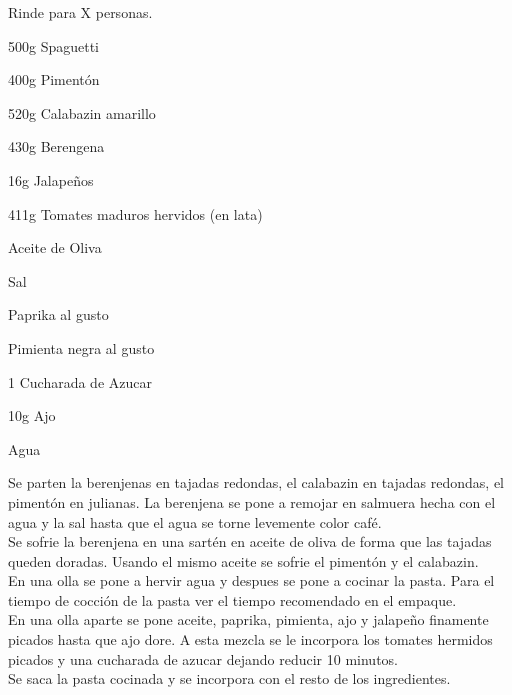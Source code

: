 
Rinde para X personas.\\

\begin{ingredientes}
\item 500g Spaguetti
\item 400g Pimentón
\item 520g Calabazin amarillo
\item 430g Berengena
\item 16g Jalapeños
\item 411g Tomates maduros hervidos (en lata)
\item Aceite de Oliva
\item Sal
\item Paprika al gusto
\item Pimienta negra al gusto
\item 1 Cucharada de Azucar
\item 10g Ajo
\item Agua
\end{ingredientes}
\preparacion
Se parten la berenjenas en tajadas redondas, el calabazin en tajadas redondas, el pimentón en julianas. La berenjena se pone a remojar en salmuera hecha con el agua y la sal hasta que el agua se torne levemente color café.\\

Se sofrie la berenjena en una sartén en aceite de oliva de forma que las tajadas queden doradas. Usando el mismo aceite se sofrie el pimentón y el calabazin.\\

En una olla se pone a hervir agua y despues se pone a cocinar la pasta. Para el tiempo de cocción de la pasta ver el tiempo recomendado en el empaque.\\

En una olla aparte se pone aceite, paprika, pimienta, ajo y jalapeño finamente picados  hasta que ajo dore. A esta mezcla se le incorpora los tomates hermidos picados y una cucharada de azucar dejando reducir 10 minutos.\\

Se saca la pasta cocinada y se incorpora con el resto de los ingredientes.

